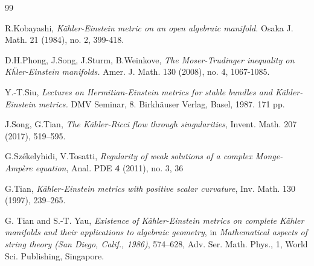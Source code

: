 \documentclass[11pt]{amsart}
\numberwithin{equation}{section}
\begin{document}
\begin{thebibliography}{99}
  
   R.Kobayashi, 
 {\em K\"ahler-Einstein metric on an open algebraic manifold.}
  Osaka J. Math. 21 (1984), no. 2, 399-418. 


 
    D.H.Phong, J.Song, J.Sturm, B.Weinkove,
   {\em The Moser-Trudinger inequality on K\"hler-Einstein manifolds.}
    Amer. J. Math. 130 (2008), no. 4, 1067-1085.
   
  
 
  Y.-T.Siu, 
  {\it Lectures on Hermitian-Einstein metrics for stable bundles and K\"ahler-Einstein metrics.}
   DMV Seminar, 8. Birkhäuser Verlag, Basel, 1987. 171 pp.
   

   
 J.Song, G.Tian,   
\emph{The {K}\"ahler-{R}icci flow through  singularities}, 
Invent. Math. {207} (2017),  519--595.
  

 
 G.Sz\'ekelyhidi, V.Tosatti, 
{\em Regularity of weak solutions of a complex Monge-Amp\`ere equation}, Anal. PDE {\bf 4} (2011), no. 3, 36


  G.Tian,
 {\em K\"ahler-Einstein metrics with positive scalar curvature}, Inv. Math. 130 (1997), 239--265.
 
 G. Tian and S.-T. Yau, {\em Existence of K\"ahler-Einstein metrics on complete K\"ahler manifolds and their applications to algebraic geometry}, in {\it Mathematical aspects of string theory (San Diego, Calif., 1986)}, 574--628, Adv. Ser. Math. Phys., 1, World Sci. Publishing, Singapore. 


 \end{thebibliography}
 
 
 
   
\end{document}
